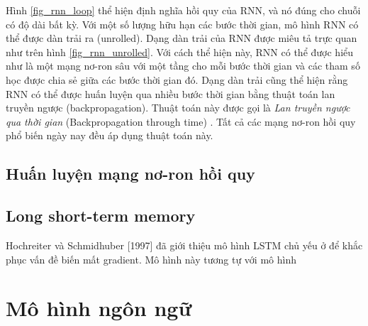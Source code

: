 Hình \ref{fig_rnn_loop} thể hiện định nghĩa hồi quy của RNN, và nó đúng cho chuỗi có độ dài bất kỳ. Với một số lượng hữu hạn các bước thời gian, mô hình RNN có thể được dàn trải ra (unrolled). Dạng dàn trải của RNN được miêu tả trực quan như trên hình \ref{fig_rnn_unrolled}. Với cách thể hiện này, RNN có thể được hiểu như là một mạng nơ-ron sâu với một tầng cho mỗi bước thời gian và các tham số học được chia sẻ giữa các bước thời gian đó. Dạng dàn trải cũng thể hiện rằng RNN có thể được huấn luyện qua nhiều bước thời gian bằng thuật toán lan truyền ngược (backpropagation). Thuật toán này được gọi là \textit{Lan truyền ngược qua thời gian} (Backpropagation through time) \cite{werbos1990}. Tất cả các mạng nơ-ron hồi quy phổ biến ngày nay đều áp dụng thuật toán này.



\subsection{Huấn luyện mạng nơ-ron hồi quy}



\subsection{Long short-term memory}

Hochreiter và Schmidhuber [1997] đã giới thiệu mô hình LSTM chủ yếu ở để khắc phục vấn đề biến mất gradient. Mô hình này tương tự với mô hình 

\section{Mô hình ngôn ngữ}

